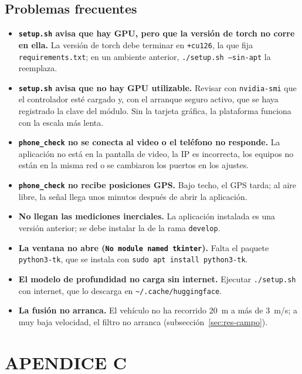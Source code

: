 \section{Problemas frecuentes}

\begin{itemize}
\item \textbf{\texttt{setup.sh} avisa que hay GPU, pero que la versión de torch no corre en ella.}
La versión de torch debe terminar en \texttt{+cu126}, la que fija \texttt{requirements.txt}; en un ambiente anterior, \texttt{./setup.sh --sin-apt} la reemplaza.

\item \textbf{\texttt{setup.sh} avisa que no hay GPU utilizable.}
Revisar con \texttt{nvidia-smi} que el controlador esté cargado y, con el arranque seguro activo, que se haya registrado la clave del módulo.
Sin la tarjeta gráfica, la plataforma funciona con la escala más lenta.

\item \textbf{\texttt{phone\_check} no se conecta al video o el teléfono no responde.}
La aplicación no está en la pantalla de video, la IP es incorrecta, los equipos no están en la misma red o se cambiaron los puertos en los ajustes.

\item \textbf{\texttt{phone\_check} no recibe posiciones GPS.}
Bajo techo, el GPS tarda; al aire libre, la señal llega unos minutos después de abrir la aplicación.

\item \textbf{No llegan las mediciones inerciales.}
La aplicación instalada es una versión anterior; se debe instalar la de la rama \texttt{develop}.

\item \textbf{La ventana no abre (\texttt{No module named tkinter}).}
Falta el paquete \texttt{python3-tk}, que se instala con \texttt{sudo apt install python3-tk}.

\item \textbf{El modelo de profundidad no carga sin internet.}
Ejecutar \texttt{./setup.sh} con internet, que lo descarga en \verb|~/.cache/huggingface|.

\item \textbf{La fusión no arranca.}
El vehículo no ha recorrido 20~m a más de 3~m/s; a muy baja velocidad, el filtro no arranca (subsección~\ref{sec:res-campo}).
\end{itemize}

\chapter{APENDICE C}
\label{appendix:apendiceC}

